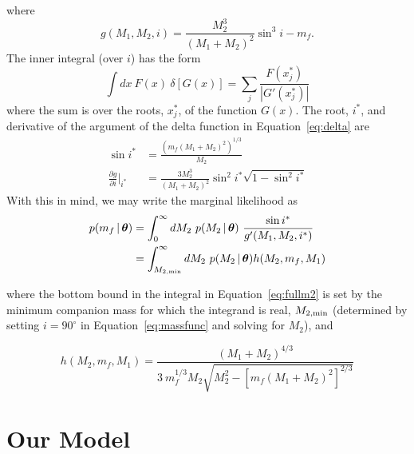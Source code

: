 \documentclass[apjl]{emulateapj}
\newcommand{\given}{\,|\,}
\newcommand{\bs}[1]{\boldsymbol{#1}}
\newcommand{\degree}{^{\circ}}
\begin{document}
where
\begin{equation}
	g(M_1,M_2,i) = \frac{M_2^3}{(M_1+M_2)^2}\sin^3 i - m_f.
\end{equation}
The inner integral (over $i$) has the form
\begin{equation}
    \int dx~F(x)~\delta \left[ G(x) \right] = \sum_j \frac{F(x^*_j)}{|G'(x^*_j)|}
\end{equation}
where the sum is over the roots, $x^*_j$, of the function $G(x)$. The root, $i^*$, and derivative of the argument of the delta function in Equation~\ref{eq:delta} are 
\begin{align}
	\sin i^* &= \frac{(m_f(M_1+M_2)^2)^{1/3}}{M_2}\\
	\frac{\partial g}{\partial i}\bigg\rvert_{i^*} &= \frac{3M_2^3}{(M_1+M_2)^2} \sin^2 i^* \sqrt{1 - \sin^2 i^*}
\end{align}
With this in mind, we may write the marginal likelihood as
\begin{align}
	p(m_f \given \bs{\theta}) &= \int_{0}^\infty dM_2~p(M_2 \given \bs{\theta})~\frac{\sin i^*}{g'(M_1,M_2,i^*)}\\
	&= \int_{M_{2,{\rm min}}}^\infty dM_2~p(M_2 \given \bs{\theta}) h(M_2, m_f, M_1) \label{eq:fullm2}
\end{align}

where the bottom bound in the integral in Equation~\ref{eq:fullm2} is set by the minimum companion mass for which the integrand is real, $M_{2,{\rm min}}$ (determined by setting $i=90\degree$ in Equation~\ref{eq:massfunc} and solving for $M_2$), and

\begin{equation}
h(M_2, m_f, M_1) = \frac{(M_1+M_2)^{4/3}}{3\ m_f^{1/3}M_2\sqrt{M_2^2 - \left[ m_f(M_1+M_2)^2 \right]^{2/3}}}
\end{equation}






\section{Our Model} \label{sec:experiments}
\end{document}

